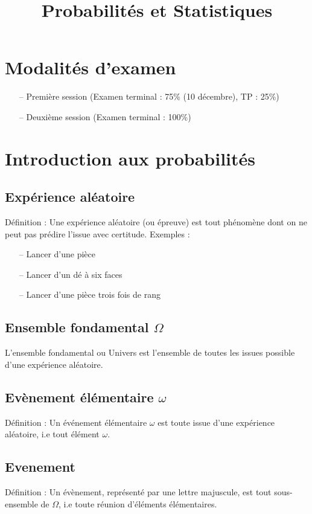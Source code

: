\documentclass{article}
\title{Probabilités et Statistiques}
\date{}
\begin{document}
    \maketitle
    \tableofcontents
    \newpage
    \section*{Modalités d'examen}
        \begin{itemize}
            \item[--] Première session (Examen terminal : 75\% (10 décembre), TP : 25\%)
            \item[--] Deuxième session (Examen terminal : 100\%)
        \end{itemize}
    \section{Introduction aux probabilités}
        \subsection{Expérience aléatoire}
            Définition : Une expérience aléatoire (ou épreuve) est tout phénomène dont on ne 
            peut pas prédire l'issue avec certitude.
            Exemples :
                \begin{itemize}
                    \item[--] Lancer d'une pièce
                    \item[--] Lancer d'un dé à six faces 
                    \item[--] Lancer d'une pièce trois fois de rang 
                \end{itemize}
        \subsection{Ensemble fondamental $\Omega$}
            L'ensemble fondamental ou Univers est l'ensemble de toutes les issues possible
            d'une expérience aléatoire.
        \subsection{Evènement élémentaire $\omega$}
                Définition : Un événement élémentaire $\omega$ est toute issue d'une 
                expérience aléatoire, i.e tout élément $\omega$.
        \subsection{Evenement}
                Définition : Un évènement, représenté par une lettre majuscule, est tout
                sous-ensemble de $\Omega$, i.e toute réunion d'éléments élémentaires.
\end{document}
